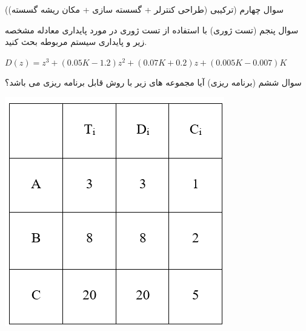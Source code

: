 \documentclass[12pt]{article}
\begin{document}
    \begin{problem}{سوال چهارم}
    	(ترکیبی (طراحی کنترلر + گسسته سازی + مکان ریشه گسسته))
    	
    \end{problem}
    
    \begin{problem}{سوال پنجم}
    	(تست ژوری) با استفاده از تست ژوری در مورد پایداری معادله مشخصه زیر و پایداری سیستم مربوطه بحث کنید.
    	
    	\centering
    	$D(z) = z^3 + (0.05K-1.2)z^2 + (0.07K + 0.2)z + (0.005K - 0.007)K$
    \end{problem}
    
    \begin{problem}{سوال ششم}
    	(برنامه ریزی) آیا مجموعه  های زیر با روش 
    	قابل برنامه ریزی می باشد؟
    	
    	\centering
    	\includegraphics[scale=1]{Resources/2.png}
    \end{problem}
\end{document}
